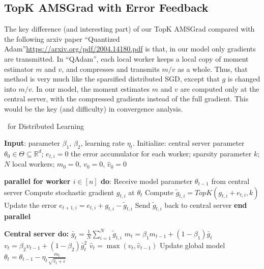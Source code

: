 \documentclass[11pt]{article}
\begin{document}
\subsection{TopK AMSGrad with Error Feedback}




The key difference (and interesting part) of our TopK AMSGrad compared with the following arxiv paper ``Quantized Adam''\url{https://arxiv.org/pdf/2004.14180.pdf} is that, in our model only gradients are transmitted. In ``QAdam'', each local worker keeps a local copy of moment estimator $m$ and $v$, and compresses and transmits $m/v$ as a whole. Thus, that method is very much like the sparsified distributed SGD, except that $g$ is changed into $m/v$. In our model, the moment estimates $m$ and $v$ are computed only at the central server, with the compressed gradients instead of the full gradient. This would be the key (and difficulty) in convergence analysis.


\begin{algorithm}[H]
\caption{\algo\ for Distributed Learning} \label{alg:sparsams}
\begin{algorithmic}[1]

\STATE \textbf{Input}: parameter $\beta_1$, $\beta_2$, learning rate $\eta_t$. 
\STATE Initialize: central server parameter $\theta_{0} \in \Theta \subseteq \mathbb R^d$; $e_{t,i}=0$ the error accumulator for each worker; sparsity parameter $k$; $N$ local workers; $m_0=0$, $v_0=0$, $\hat v_0=0$


\STATE\textbf{parallel for worker $i \in [n]$ do}:
\STATE\quad  Receive model parameter $\theta_{t-1}$ from central server
\STATE\quad  Compute stochastic gradient $g_{t,i}$ at $\theta_t$
\STATE\quad  Compute $\tilde g_{t,i}=TopK(g_{t,i}+e_{t,i},k)$ \label{line:topk}
\STATE\quad  Update the error $e_{t+1,i}=e_{t,i}+g_{t,i}-\tilde g_{t,i}$
\STATE\quad  Send $\tilde g_{t,i}$ back to central server
\STATE \textbf{end parallel}

\STATE \textbf{Central server do:}
\STATE $\bar g_{t}=\frac{1}{N}\sum_{i=1}^N \tilde g_{t,i}$
\STATE $m_t=\beta_1 m_{t-1}+(1-\beta_1)\bar g_t$
\STATE $v_t=\beta_2 v_{t-1}+(1-\beta_2)\bar g_t^2$
\STATE $\hat v_t=\max(v_t,\hat v_{t-1})$
\STATE Update global model $\theta_t=\theta_{t-1}-\eta_t\frac{m_t}{\sqrt{\hat v_t+\epsilon}}$

\ENDFOR
\end{algorithmic}
\end{algorithm}
\end{document}
